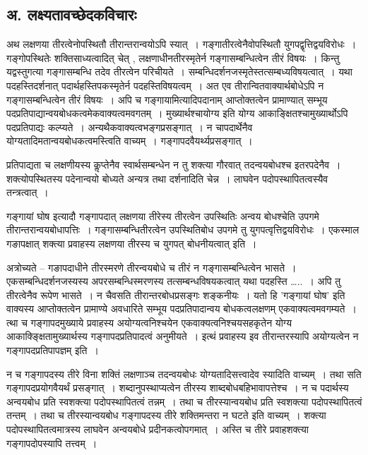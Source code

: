 		\subsection{अ. लक्ष्यतावच्छेदकविचारः}
			
			\begin{small}
			
				अथ लक्षणया तीरत्वेनोपस्थितौ तीरान्तरान्वयोऽपि स्यात्~। गङ्गातीरत्वेनैवोपस्थितौ युगपद्वृत्तिद्वयविरोधः~। गङ्गोपस्थितेः शक्तिसाध्यत्वादित् चेत् , लक्षणाधीनतीरस्मृतेर्न गङ्गासम्बन्धित्वेन तीरं विषयः~। किन्तु यद्वस्तुगत्या गङ्गासम्बन्धि तदेव तीरत्वेन परिचीयते~। सम्बन्धिदर्शनजस्मृतेस्तत्सम्बध्यविषयत्वात्~। यथा पदहस्तिदर्शनात् पदार्थहस्तिपकस्मृतेर्न पदहस्तिविषयत्वम्~। अत एव तीरान्वितवाक्यार्थबोधेऽपि न गङ्गासम्बन्धित्वेन तीरं विषयः~। अपि च गङ्गायामित्यादिपदानाम् आप्तोक्तत्वेन प्रामाण्यात् सम्भूय पदप्रतिपाद्यान्वयबोधकत्वमेकवाक्यत्वमवगतम्~। मुख्यार्थश्चायोग्य इति योग्य आकाङ्क्षितश्चामुख्यार्थोऽपि पदप्रतिपाद्यः कल्प्यते~। अन्यथैकवाक्यत्वभङ्गप्रसङ्गात्~। न चापदार्थेनैव योग्यतादिमतान्वयबोधकत्वमस्त्विति वाच्यम्~। गङ्गापदवैयर्थ्यप्रसङ्गात्~। 
			
				प्रतिपाद्यता च लक्षणीयस्य कॢप्तेनैव स्वार्थसम्बन्धेन न तु शक्त्या गौरवात् तदन्वयबोधश्च इतरपदेनैव~। शक्त्योपस्थितस्य पदेनान्वयो बोध्यते अन्यत्र तथा दर्शनादिति चेन्न~। लाघवेन पदोपस्थापितत्वस्यैव तन्त्रत्वात्~। 
			\end{small}
			
			गङ्गायां घोष इत्यादौ गङ्गापदात् लक्षणया तीरेस्य तीरत्वेन उपस्थितिः अन्वय बोधश्चेति उपगमे तीरान्तरान्वयबोधापत्तिः~।  गङ्गासम्बन्धितीरत्वेन उपस्थितिबोध उपगमे तु युगपत्वृत्तिद्वयविरोधः~। एकस्माल गङापक्षात् शक्त्या प्रवाहस्य लक्षणया तीरस्य च युगपत् बोधनीयत्वात् इति~।
	
			अत्रोच्यते – गङापदाधीने तीरस्मरणे तीरन्वयबोधे च तीरं न गङ्गासम्बन्धित्वेन भासते~। एकसम्बन्धिदर्शनजस्यस्य  अपरसम्बन्धिस्मरणस्य तत्सम्बन्धविषयकत्वात् यथा पदहस्ति …..~। अपि तु तीरत्वेनैव रूपेण भासते~। न चैवसति तीरान्तरबोधप्रसङ्गः शङ्कनीयः~। यतो हि  ’गङ्गायां घोष’ इति  वाक्यस्य आप्तोक्तत्वेन प्रामाण्ये अवधारिते सम्भूय पदप्रतिपादान्वय बोधकत्वलक्षणम् एकवाक्यत्वमवगम्यते~। त्था च गङ्गापदमुख्याये प्रवाहस्य अयोग्यत्वनिश्चयेन एकवाक्यत्वनिश्चयसहकृतेन योग्य आकाक्ङ्क्षितामुख्यार्थस्य  गङ्गापदप्रतिपादत्वं अनुमीयते~। इत्थं  प्रवाहस्य इव तीरान्तरस्यापि अयोग्यत्वेन न गङ्गापदप्रतिपापज्ञम् इति~।
	
			न च गङ्गापदस्य तीरे विना शक्तिं लक्षणाञ्च तदन्वयबोधः योग्यतादिसत्त्वादेव स्यादिति वाच्यम्~। तथा सति गङ्गापदप्रयोगवैयर्थं  प्रसङ्गात्~। शब्दानुपस्थाप्यत्वेन तीरस्य शाब्दबोधबहिभावापत्तेश्च~। न च पदार्थस्य अन्वयबोध प्रति स्वशक्त्या पदोपस्थापितत्वं तन्नम्~। तथा च तीरस्यान्वयबोध प्रति स्वशक्त्या पदोपस्थापितत्वं तन्तम्~। तथा च तीरस्यान्वयबोध गङ्गापदस्य तीरे शक्तिमन्तरा न घटते इति वाच्यम्~। शक्त्या पदोपस्थापितत्वमात्रस्य लाघवेन अन्वयबोधे प्रदीनकत्वोपगमात्~। अस्ति च तीरे प्रवाहशक्त्या गङ्गापदोपस्यापि तत्त्वम्~।

